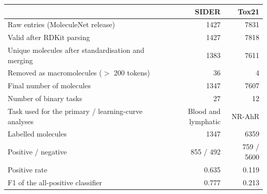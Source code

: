 \begin{tabular}{lrr}
\toprule
 & SIDER & Tox21 \\
\midrule
Raw entries (MoleculeNet release) & 1427 & 7831 \\
Valid after RDKit parsing & 1427 & 7818 \\
Unique molecules after standardisation and merging & 1383 & 7611 \\
Removed as macromolecules ($>$ 200 tokens) & 36 & 4 \\
Final number of molecules & 1347 & 7607 \\
Number of binary tasks & 27 & 12 \\
\midrule
Task used for the primary / learning-curve analyses & Blood and lymphatic & NR-AhR \\
\quad Labelled molecules & 1347 & 6359 \\
\quad Positive / negative & 855 / 492 & 759 / 5600 \\
\quad Positive rate & 0.635 & 0.119 \\
\quad F1 of the all-positive classifier & 0.777 & 0.213 \\
\bottomrule
\end{tabular}